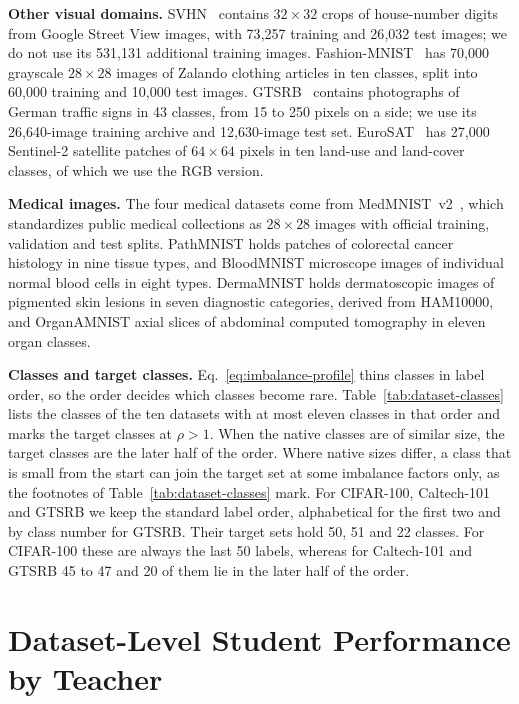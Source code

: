 \documentclass[review,number,sort&compress]{elsarticle}
\theoremstyle{definition}
\begin{document}
\textbf{Other visual domains.} SVHN~\citep{netzer2011reading} contains
$32\times32$ crops of house-number digits from Google Street View
images, with 73{,}257 training and 26{,}032 test images; we do not use
its 531{,}131 additional training images.
Fashion-MNIST~\citep{xiao2017fashion} has 70{,}000 grayscale
$28\times28$ images of Zalando clothing articles in ten classes, split
into 60{,}000 training and 10{,}000 test images.
GTSRB~\citep{stallkamp2012man} contains photographs of German traffic
signs in 43 classes, from 15 to 250 pixels on a side; we use its
26{,}640-image training archive and 12{,}630-image test set.
EuroSAT~\citep{helber2019eurosat} has 27{,}000 Sentinel-2 satellite
patches of $64\times64$ pixels in ten land-use and land-cover classes,
of which we use the RGB version.

\textbf{Medical images.} The four medical datasets come from
MedMNIST~v2~\citep{yang2023medmnist}, which standardizes public medical
collections as $28\times28$ images with official training, validation
and test splits. PathMNIST holds patches of colorectal cancer histology
in nine tissue types, and BloodMNIST microscope images of individual
normal blood cells in eight types. DermaMNIST holds dermatoscopic images
of pigmented skin lesions in seven diagnostic categories, derived from
HAM10000, and OrganAMNIST axial slices of abdominal computed tomography
in eleven organ classes.

\textbf{Classes and target classes.}
Eq.~\eqref{eq:imbalance-profile} thins classes in label order, so the
order decides which classes become rare.
Table~\ref{tab:dataset-classes} lists the classes of the ten datasets
with at most eleven classes in that order and marks the target classes
at $\rho>1$. When the native classes are of similar size, the target
classes are the later half of the order. Where native sizes differ, a
class that is small from the start can join the target set at some
imbalance factors only, as the footnotes of
Table~\ref{tab:dataset-classes} mark. For CIFAR-100, Caltech-101
and GTSRB we keep the standard label order, alphabetical for the first
two and by class number for GTSRB.
Their target sets hold 50, 51 and 22 classes. For CIFAR-100 these are
always the last 50 labels, whereas for Caltech-101 and GTSRB 45 to 47
and 20 of them lie in the later half of the order.

\section{Dataset-Level Student Performance\\by Teacher}
\label{app:dataset-student-outcomes}
\end{document}
